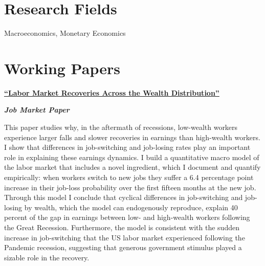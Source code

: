 \documentclass[margin,line]{res}                          %
\newenvironment{list1}{
	\begin{list}{\ding{113}}{%
			\setlength{\itemsep}{0in}
			\setlength{\parsep}{0in} \setlength{\parskip}{0in}
			\setlength{\topsep}{0in} \setlength{\partopsep}{0in}
			\setlength{\leftmargin}{0.17in}}}{\end{list}}
\begin{document}
\begin{resume}
		\section{\sc Research Fields}%
	\begin{list1}
		\item[] Macroeconomics, Monetary Economics
	\end{list1}
	
	\section{\sc Working Papers}
	\begin{list1}
		\item[] \href{https://danicaratelli.github.io/research/papers/JMP_Caratelli.pdf}{\textbf{{\color{darkblue}``Labor Market Recoveries Across the Wealth Distribution''}}}\smallskip
		\item[] \emph{\textbf{Job Market Paper}}\smallskip
		\item[] This paper studies why, in the aftermath of recessions, low-wealth workers experience larger falls and slower recoveries in earnings than high-wealth workers. I show that differences in job-switching and job-losing rates play an important role in explaining these earnings dynamics. I build a quantitative macro model of the labor market that includes a novel ingredient, which I document and quantify empirically: when workers switch to new jobs they suffer a 6.4 percentage point increase in their job-loss probability over the first fifteen months at the new job. Through this model I conclude that cyclical differences in job-switching and job-losing by wealth, which the model can endogenously reproduce, explain 40 percent of the gap in earnings between low- and high-wealth workers following the Great Recession. Furthermore, the model is consistent with the sudden increase in job-switching that the US labor market experienced following the Pandemic recession, suggesting that generous government stimulus played a sizable role in the recovery.  
		
		\vspace{7pt}
		

\end{list1}
\end{resume}
\end{document}
